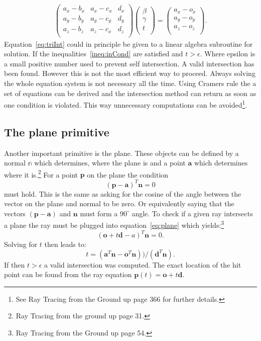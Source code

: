 \begin{align}
\begin{pmatrix}
a_x - b_x & a_x - c_x & d_x \\
a_y - b_y & a_y - c_y & d_y \\
a_z - b_z & a_z - c_x & d_z \\
\end{pmatrix}
\begin{pmatrix}
\beta \\ \gamma \\ t \\
\end{pmatrix}
= 
\begin{pmatrix}
a_x - o_x \\
a_y - o_y \\
a_z - o_z \\
\end{pmatrix}.
\label{eq:triInt}
\end{align}
Equation~\ref{eq:triInt} could in principle be given to a linear algebra subroutine for solution. If the inequalities~\ref{ineq:inCond} are satisfied and $t > \epsilon$. Where epsilon is a small positive number used to prevent self intersection. A valid intersection has been found. However this
is not the most efficient way to proceed. Always solving the whole equation system is not necessary all the time.
Using Cramers rule the a set of equations can be derived and the intersection method can return as soon as one 
condition is violated. This way unnecessary computations can be avoided\footnote{See Ray Tracing from the Ground up page 366 for further details.}.

\subsection{The plane primitive}
Another important primitive is the plane. These objects can be defined by a normal $\mathbb{n}$ which determines, where
the plane is and a point $\mathbf{a}$ which determines where it is.\footnote{Ray Tracing from the ground up page 31.} 
For a point $\mathbf{p}$ on the plane the condition 
\begin{equation}
(\mathbf{p} - \mathbf{a})^T  \mathbf{n} = 0
\label{eq:plane}
\end{equation} 
must hold. This is the same as asking for the cosine of the angle between the vector on the plane and normal to be zero. Or equivalently saying that the vectors $(\mathbf{p} - \mathbf{a})$ and $\mathbf{n}$ must form a $90^{\circ}$ angle. To check if a given ray intersects a plane the ray must be plugged into equation~\ref{eq:plane} which yields:\footnote{Ray Tracing from the Ground up page 54.}
\begin{equation}
(\mathbf{o} + t\mathbf{d} - a)^T \mathbf{n} = 0.
\end{equation}
Solving for $t$ then leads to:
\begin{equation}
t = (\mathbf{a}^T\mathbf{n} -  \mathbf{o}^T\mathbf{n}) ) / (\mathbf{d}^T \mathbf{n}).
\end{equation}
If then $ t > \epsilon$ a valid intersection was computed. The exact location of the hit point can be found from the ray equation $\mathbf{p}(t) = \mathbf{o} + t\mathbf{d}$. 

